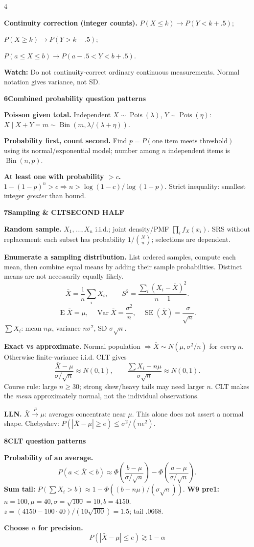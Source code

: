\documentclass[a4paper,landscape]{article}
\newcommand{\head}[2][late]{\par\vspace{3pt}\noindent\colorbox{#1}{\parbox{\dimexpr\linewidth-6pt}{\color{white}\bfseries #2}}\par\vspace{1pt}}
\newcommand{\cue}[1]{\par\textbf{#1}\enspace}
\newcommand{\trap}[1]{\par{\color{alert}\textbf{Watch:} #1}}
\newcommand{\E}{\operatorname{E}}
\newcommand{\V}{\operatorname{Var}}
\newcommand{\SE}{\operatorname{SE}}
\newcommand{\Xb}{\bar X}
\newcommand{\col}{\par\vfill\columnbreak}
\begin{document}
\begin{multicols*}{4}
\cue{Continuity correction (integer counts).}
\(P(X\le k)\to P(Y<k+.5)\);\par
\(P(X\ge k)\to P(Y>k-.5)\);\par
\(P(a\le X\le b)\to P(a-.5<Y<b+.5)\).
\trap{Do not continuity-correct ordinary continuous measurements. Normal notation gives variance, not SD.}
\head[early]{6\quad Combined probability question patterns}
\cue{Poisson given total.} Independent \(X\sim\operatorname{Pois}(\lambda)\), \(Y\sim\operatorname{Pois}(\eta)\):
\(X\mid X+Y=m\sim\operatorname{Bin}(m,\lambda/(\lambda+\eta))\).
\cue{Probability first, count second.} Find \(p=P(\text{one item meets threshold})\) using its normal/exponential model; number among \(n\) independent items is \(\operatorname{Bin}(n,p)\).
\cue{At least one with probability \(>c\).}
\(1-(1-p)^n>c\Rightarrow n>\log(1-c)/\log(1-p)\). Strict inequality: smallest integer \emph{greater} than bound.
\col
\head{7\quad Sampling \& CLT\hfill SECOND HALF}
\cue{Random sample.} \(X_1,\ldots,X_n\) i.i.d.; joint density/PMF \(\prod_i f_X(x_i)\).
SRS without replacement: each subset has probability \(1/{N\choose n}\); selections are dependent.
\cue{Enumerate a sampling distribution.} List ordered samples, compute each mean, then combine equal means by adding their sample probabilities. Distinct means are not necessarily equally likely.
\[\Xb=\frac1n\sum_iX_i,\qquad
 S^2=\frac{\sum_i(X_i-\Xb)^2}{n-1}.\]
\[\E\Xb=\mu,\quad\V\Xb=\frac{\sigma^2}{n},\quad
 \SE(\Xb)=\frac{\sigma}{\sqrt n}.\]
\(\sum X_i\): mean \(n\mu\), variance \(n\sigma^2\), SD \(\sigma\sqrt n\).
\cue{Exact vs approximate.} Normal population \(\Rightarrow\Xb\sim N(\mu,\sigma^2/n)\) for \emph{every} \(n\). Otherwise finite-variance i.i.d. CLT gives
\[\frac{\Xb-\mu}{\sigma/\sqrt n}\approx N(0,1),\qquad
 \frac{\sum X_i-n\mu}{\sigma\sqrt n}\approx N(0,1).\]
Course rule: large \(n\ge30\); strong skew/heavy tails may need larger \(n\). CLT makes the \emph{mean} approximately normal, not the individual observations.
\cue{LLN.} \(\Xb\xrightarrow{P}\mu\): averages concentrate near \(\mu\). This alone does not assert a normal shape. Chebyshev: \(P(|\Xb-\mu|\ge e)\le\sigma^2/(ne^2)\).
\head{8\quad CLT question patterns}
\cue{Probability of an average.}
\[P(a<\Xb<b)\approx
 \Phi\!\left(\frac{b-\mu}{\sigma/\sqrt n}\right)
 -\Phi\!\left(\frac{a-\mu}{\sigma/\sqrt n}\right).\]
\textbf{Sum tail:} \(P(\sum X_i>b)\approx1-\Phi((b-n\mu)/(\sigma\sqrt n))\). \textbf{W9 pre1:} \(n=100,\mu=40,\sigma=\sqrt{100}=10,b=4150\). \(z=(4150-100\cdot40)/(10\sqrt{100})=1.5\); tail \(.0668\).
\cue{Choose \(n\) for precision.}
\[P(|\Xb-\mu|\le e)\gtrsim1-\alpha
\]
\end{multicols*}
\end{document}
